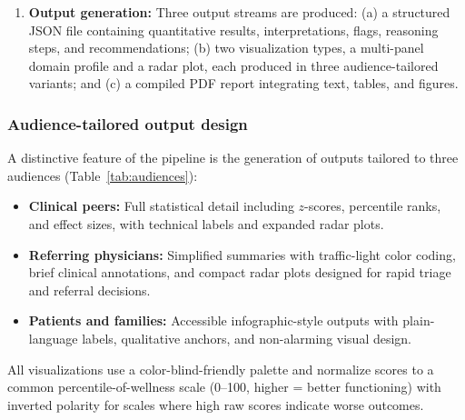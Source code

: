 \documentclass[11pt,a4paper]{article}
\begin{document}
\begin{enumerate}[leftmargin=*, label=(\roman*)]
\begin{figure}[H]
\caption{\textbf{Eight-step clinical reasoning chain.} Step~1 provides demographic and clinical context. Steps~2--6 assess five domains independently (parallel). Step~7 integrates findings across domains, identifying co-occurring patterns. Step~8 produces the prognostic formulation.}
\label{fig:reasoning_chain}
\end{figure}

    \item \textbf{Output generation:} Three output streams are produced: (a) a structured JSON file containing quantitative results, interpretations, flags, reasoning steps, and recommendations; (b) two visualization types, a multi-panel domain profile and a radar plot, each produced in three audience-tailored variants; and (c) a compiled PDF report integrating text, tables, and figures.
\end{enumerate}

\subsubsection{Audience-tailored output design}

A distinctive feature of the pipeline is the generation of outputs tailored to three audiences (Table~\ref{tab:audiences}):

\begin{itemize}[leftmargin=*]
    \item \textbf{Clinical peers:} Full statistical detail including $z$-scores, percentile ranks, and effect sizes, with technical labels and expanded radar plots.

    \item \textbf{Referring physicians:} Simplified summaries with traffic-light color coding, brief clinical annotations, and compact radar plots designed for rapid triage and referral decisions.

    \item \textbf{Patients and families:} Accessible infographic-style outputs with plain-language labels, qualitative anchors, and non-alarming visual design.
\end{itemize}

All visualizations use a color-blind-friendly palette \citep{Wong2011} and normalize scores to a common percentile-of-wellness scale (0--100, higher = better functioning) with inverted polarity for scales where high raw scores indicate worse outcomes.
\end{document}
